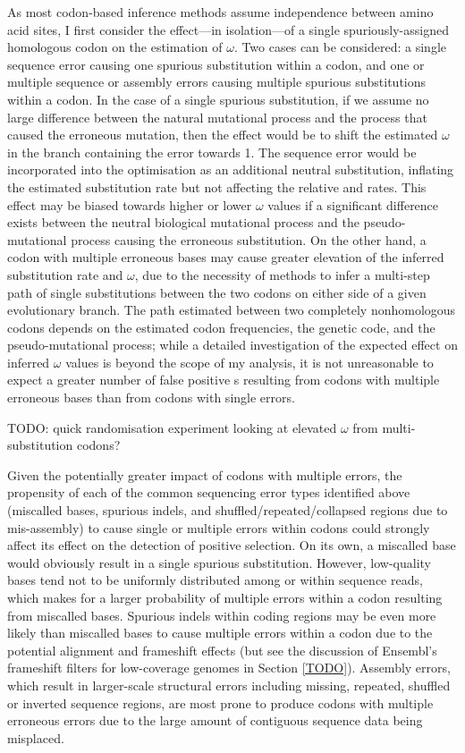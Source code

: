 As most codon-based inference methods assume independence between
amino acid sites, I first consider the effect---in isolation---of a
single spuriously-assigned homologous codon on the \ml estimation of
$\omega$. Two cases can be considered: a single sequence error causing
one spurious substitution within a codon, and one or multiple sequence
or assembly errors causing multiple spurious substitutions within a
codon. In the case of a single spurious substitution, if we assume no
large difference between the natural mutational process and the
process that caused the erroneous mutation, then the effect would be
to shift the estimated $\omega$ in the branch containing the error
towards 1. The sequence error would be incorporated into the \ml
optimisation as an additional neutral substitution, inflating the
estimated substitution rate but not affecting the relative \nsyn and
\syn rates. This effect may be biased towards higher or lower $\omega$
values if a significant difference exists between the neutral
biological mutational process and the pseudo-mutational process
causing the erroneous substitution. On the other hand, a codon with
multiple erroneous bases may cause greater elevation of the inferred
substitution rate and $\omega$, due to the necessity of \ml methods to
infer a multi-step path of single substitutions between the two codons
on either side of a given evolutionary branch. The path estimated
between two completely nonhomologous codons depends on the estimated
codon frequencies, the genetic code, and the pseudo-mutational
process; while a detailed investigation of the expected effect on
inferred $\omega$ values is beyond the scope of my analysis, it is not
unreasonable to expect a greater number of false positive \pss{}s
resulting from codons with multiple erroneous bases than from codons
with single errors.

{\color{red} TODO: quick randomisation experiment looking at elevated
  $\omega$ from multi-substitution codons?}

Given the potentially greater impact of codons with multiple errors,
the propensity of each of the common sequencing error types identified
above (miscalled bases, spurious indels, and
shuffled/repeated/collapsed regions due to mis-assembly) to cause
single or multiple errors within codons could strongly affect its
effect on the detection of positive selection. On its own, a miscalled
base would obviously result in a single spurious
substitution. However, low-quality bases tend not to be uniformly
distributed among or within sequence reads, which makes for a larger
probability of multiple errors within a codon resulting from miscalled
bases. Spurious indels within coding regions may be even more likely
than miscalled bases to cause multiple errors within a codon due to
the potential alignment and frameshift effects (but see the discussion
of Ensembl's frameshift filters for low-coverage genomes in Section
\ref{TODO}). Assembly errors, which result in larger-scale structural
errors including missing, repeated, shuffled or inverted sequence
regions, are most prone to produce codons with multiple erroneous
errors due to the large amount of contiguous sequence data being
misplaced.

